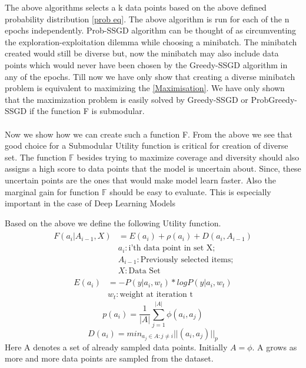 \documentclass[a4paper,twoside]{iiththesis}
\theoremstyle{definition}
\theoremstyle{definition}
\theoremstyle{remark}
\begin{document}
The above algorithms selects a k data points based on the above defined probability distribution \ref{prob eq}. The above algorithm is run for each of the n epochs independently. Prob-SSGD algorithm can be thought of as circumventing the exploration-exploitation dilemma while choosing a minibatch. The minibatch created would still be diverse but, now the minibatch may also include data points which would never have been chosen by the Greedy-SSGD algorithm in any of the epochs.
Till now we have only show that creating a diverse minibatch problem is equivalent to maximizing the \ref{Maximisation}. We have only shown that the maximization problem is easily solved by Greedy-SSGD or ProbGreedy-SSGD if the function F is submodular.
\\ \\
Now we show how we can create such a function F. From the above we see that good choice for a Submodular Utility function is critical for creation of diverse set. The function  $\mathbb{F}$ besides trying to maximize coverage and diversity should also assigns a high score to data points that the model is uncertain about. Since, these uncertain points are the ones that would make model learn faster. Also the marginal gain for function $ \mathbb{F}$ should be easy to evaluate. This is especially important in the case of Deep Learning Models

Based on the above we define the following Utility function.
\begin{align}
\begin{split}
     F(a_i|A_{i-1},X)&=E(a_i) + \rho(a_i) + D(a_i, A_{i-1})\\
     &a_i: \text{i'th data point in set X};\\
    &A_{i-1}: \text{Previously selected items};\\
    &X: \text{Data Set}
    \end{split}
    \end{align}
\begin{align}
  E(a_i) &= - P(y|a_i,w_t)*log P(y|a_i,w_t)\\
  & w_t: \text{weight at iteration t}
  \label{Entropy equation}
  \end{align}
  \begin{equation}
    p(a_i)= \frac{1}{|A|}\sum_{j=1}^{|A|} \phi(a_i, a_j) \label{Kernelised Distance}
    \end{equation}
\begin{equation}
    D(a_i)= min_{a_j\in A:j\neq i}||(a_i,a_j)||_p \label{Minimum Distance}
\end{equation}
Here A denotes a set of already sampled data points. Initially $A = {\phi}$. A grows as more and more data points are sampled from the dataset.
\end{document}
